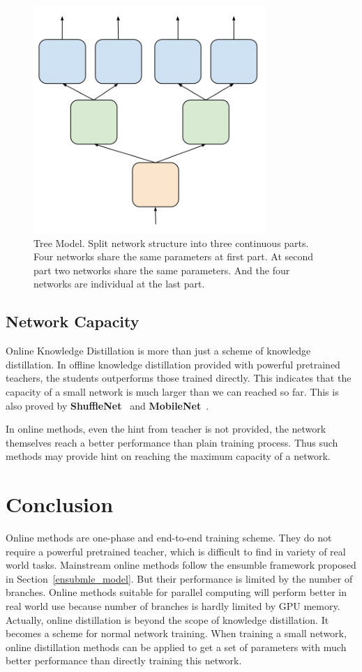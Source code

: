 \documentclass[10pt,twocolumn,letterpaper]{article}
\begin{document}
\begin{figure}[t]
   \begin{center}
   \includegraphics[width=0.6\linewidth]{hierarchical.png}
   \end{center}
      \caption{Tree Model. Split network structure into three
continuous parts. Four networks share the same parameters at first part. At second part two networks share the same parameters. And the four networks are individual at the last part.}
   \label{fig:tree_model}
\end{figure}

\subsection{Network Capacity}
Online Knowledge Distillation is more than just
a scheme of knowledge distillation.
In offline knowledge distillation provided with powerful pretrained teachers,
the students outperforms those trained directly.
This indicates that the capacity of a small network is much larger
than we can reached so far. This is also proved by \textbf{ShuffleNet}~\cite{ma2018shufflenet} and \textbf{MobileNet}~\cite{DBLP:journals/corr/HowardZCKWWAA17}.

In online methods, even the hint from teacher
is not provided, the network themselves reach
a better performance than plain training process.
Thus such methods may provide hint on reaching 
the maximum capacity of a network.
\section{Conclusion}
Online methods are one-phase and end-to-end
training scheme. They do not require a powerful
pretrained teacher, which is difficult to find
in variety of real world tasks.
Mainstream online methods follow
the ensumble framework proposed in Section~\ref{ensubmle_model}.
But their performance is limited by the number
of branches.
Online methods suitable for parallel computing
will perform better in real world use because 
number of branches is
hardly limited by GPU memory.
Actually, online distillation is beyond the scope of 
knowledge distillation. It becomes a scheme for
normal network training. When training a small network,
online distillation methods can be applied to
get a set of parameters with much better performance than
directly training this network.


{\small


}
\end{document}
